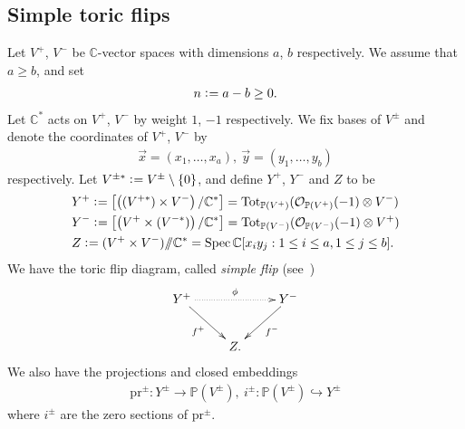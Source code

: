 \documentclass[11pt]{amsart}
\theoremstyle{plain}
\newcommand{\sslash}{/\!\!/}
\newcommand{\oO}{\mathcal{O}}
\newcommand{\Spec}{\mathop{\rm Spec}\nolimits}
\begin{document}
\subsection{Simple toric flips}\label{subsec:flip}
Let $V^+$, $V^-$ be 
$\mathbb{C}$-vector spaces with dimensions $a$, $b$
respectively. 
We assume that $a\ge b$, and set 
\begin{align*}
n\cneq a-b \ge 0. 
\end{align*}
Let $\mathbb{C}^{\ast}$ acts on $V^+$, $V^-$
by weight $1$, $-1$ respectively. We 
fix bases of $V^{\pm}$ and 
denote the 
coordinates
of $V^+$, $V^-$ by 
\begin{align*}
\vec{x}=(x_1, \ldots, x_a), \ 
\vec{y}=(y_1, \ldots, y_b)
\end{align*}
respectively. 
Let $V^{\pm \ast} \cneq V^{\pm} \setminus \{0\}$, and 
define
 $Y^+$, $Y^-$ and $Z$ to be
\begin{align}\label{def:YZ}
&Y^+ \cneq \left[ \left((V^{+ \ast}) \times V^- \right)/\mathbb{C}^{\ast} \right]
=\mathrm{Tot}_{\mathbb{P}(V^+)}(\oO_{\mathbb{P}(V^+)}(-1) \otimes V^-)
 \\
\notag
&Y^- \cneq \left[ \left( V^+ \times (V^{- \ast}) \right)/\mathbb{C}^{\ast} \right]
=\mathrm{Tot}_{\mathbb{P}(V^-)}(\oO_{\mathbb{P}(V^-)}(-1) \otimes V^+) \\
\notag
&Z \cneq (V^+ \times V^-) \sslash \mathbb{C}^{\ast}
=\Spec \mathbb{C}[x_i y_j : 1\le i\le a, 1\le j\le b]. 
\end{align}
We have the toric flip diagram, called
\textit{simple flip} (see~\cite{Rei})
\begin{align}\notag
\xymatrix{
Y^+ \ar@{.>}[rr]^-{\phi} \ar[rd]_-{f^+} & & Y^- \ar[ld]^-{f^-} \\
& Z. &
}
\end{align}
We also have the projections and closed embeddings
\begin{align}\label{emb:closed}
\mathrm{pr}^{\pm} \colon Y^{\pm} \to \mathbb{P}(V^{\pm}), \ 
i^{\pm} \colon 
\mathbb{P}(V^{\pm}) \hookrightarrow Y^{\pm}
\end{align}
where $i^{\pm}$ are the zero sections of $\mathrm{pr}^{\pm}$. 
\end{document}
